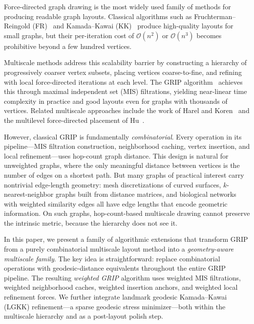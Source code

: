 \documentclass[11pt,twocolumn]{article}
\newcommand{\bigO}{\mathcal{O}}
\begin{document}
Force-directed graph drawing is the most widely used family of methods
for producing readable graph layouts.  Classical algorithms such as
Fruchterman--Reingold (FR)~\citep{fruchterman1991} and
Kamada--Kawai (KK)~\citep{kamada1989} produce high-quality layouts for
small graphs, but their per-iteration cost of $\bigO(n^2)$ or
$\bigO(n^3)$ becomes prohibitive beyond a few hundred vertices.

Multiscale methods address this scalability barrier by constructing a
hierarchy of progressively coarser vertex subsets, placing vertices
coarse-to-fine, and refining with local force-directed iterations at each
level.  The GRIP algorithm~\citep{gajer2002,gajer2004} achieves this
through maximal independent set (MIS) filtrations, yielding near-linear
time complexity in practice and good layouts even for graphs with
thousands of vertices.  Related multiscale approaches include the work of
Harel and Koren~\citep{harel2002} and the multilevel force-directed
placement of Hu~\citep{hu2005}.

However, classical GRIP is fundamentally \emph{combinatorial}.  Every
operation in its pipeline---MIS filtration construction, neighborhood
caching, vertex insertion, and local refinement---uses hop-count graph
distance.  This design is natural for unweighted graphs, where the only
meaningful distance between vertices is the number of edges on a shortest
path.  But many graphs of practical interest carry nontrivial edge-length
geometry: mesh discretizations of curved surfaces, $k$-nearest-neighbor
graphs built from distance matrices, and biological networks with
weighted similarity edges all have edge lengths that encode geometric
information.  On such graphs, hop-count-based multiscale drawing cannot
preserve the intrinsic metric, because the hierarchy does not see it.

In this paper, we present a family of algorithmic extensions that
transform GRIP from a purely combinatorial multiscale layout method into
a \emph{geometry-aware multiscale family}.  The key idea is
straightforward: replace combinatorial operations with geodesic-distance
equivalents throughout the entire GRIP pipeline.  The resulting
\emph{weighted GRIP} algorithm uses weighted MIS filtrations, weighted
neighborhood caches, weighted insertion anchors, and weighted local
refinement forces.  We further integrate landmark geodesic Kamada--Kawai
(LGKK) refinement---a sparse geodesic stress minimizer---both within the
multiscale hierarchy and as a post-layout polish step.
\end{document}

